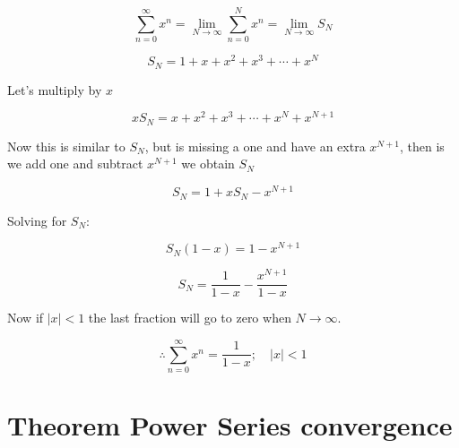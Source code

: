 \documentclass[
  letterpaper,
  DIV=11,
  numbers=noendperiod]{scrreprt}
\theoremstyle{plain}
\theoremstyle{remark}
\begin{document}
\begin{tcolorbox}[enhanced jigsaw, title=\textcolor{quarto-callout-caution-color}{\faFire}\hspace{0.5em}{Proof:}, colbacktitle=quarto-callout-caution-color!10!white, opacitybacktitle=0.6, opacityback=0, rightrule=.15mm, breakable, titlerule=0mm, colback=white, bottomtitle=1mm, colframe=quarto-callout-caution-color-frame, toprule=.15mm, leftrule=.75mm, toptitle=1mm, arc=.35mm, bottomrule=.15mm, left=2mm, coltitle=black]

\[\sum_{n=0}^\infty x^n = \lim_{N\rightarrow\infty} \sum_{n=0}^N x^n= \lim_{N\rightarrow\infty} S_N\]

\[S_N=1+x+x^2+x^3+\cdots +x^N\]

Let's multiply by \(x\)

\[xS_N=x+x^2+x^3+\cdots +x^N+x^{N+1}\]

Now this is similar to \(S_N\), but is missing a one and have an extra
\(x^{N+1}\), then is we add one and subtract \(x^{N+1}\) we obtain
\(S_N\)

\[S_N=1+xS_N-x^{N+1}\]

Solving for \(S_N\):

\[S_N(1-x)=1-x^{N+1}\]

\[S_N=\frac{1}{1-x}-\frac{x^{N+1}}{1-x}\]

Now if \(|x|<1\) the last fraction will go to zero when
\(N\rightarrow \infty\).

\[\therefore \boxed{\sum_{n=0}^\infty x^n =\frac{1}{1-x};\quad |x|<1}\]

\end{tcolorbox}

\section{Theorem Power Series
convergence}\label{theorem-power-series-convergence}
\end{document}

